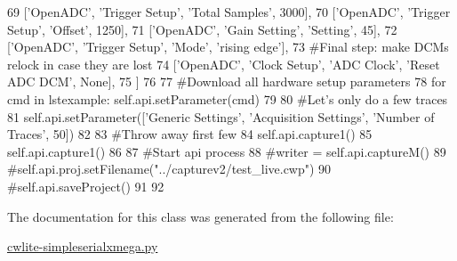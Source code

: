 \begin{DoxyCode}
69                       [\textcolor{stringliteral}{'OpenADC'}, \textcolor{stringliteral}{'Trigger Setup'}, \textcolor{stringliteral}{'Total Samples'}, 3000],
70                       [\textcolor{stringliteral}{'OpenADC'}, \textcolor{stringliteral}{'Trigger Setup'}, \textcolor{stringliteral}{'Offset'}, 1250],
71                       [\textcolor{stringliteral}{'OpenADC'}, \textcolor{stringliteral}{'Gain Setting'}, \textcolor{stringliteral}{'Setting'}, 45],
72                       [\textcolor{stringliteral}{'OpenADC'}, \textcolor{stringliteral}{'Trigger Setup'}, \textcolor{stringliteral}{'Mode'}, \textcolor{stringliteral}{'rising edge'}],
73                       \textcolor{comment}{#Final step: make DCMs relock in case they are lost}
74                       [\textcolor{stringliteral}{'OpenADC'}, \textcolor{stringliteral}{'Clock Setup'}, \textcolor{stringliteral}{'ADC Clock'}, \textcolor{stringliteral}{'Reset ADC DCM'}, \textcolor{keywordtype}{None}],
75                       ]
76         
77         \textcolor{comment}{#Download all hardware setup parameters}
78         \textcolor{keywordflow}{for} cmd \textcolor{keywordflow}{in} lstexample: self.api.setParameter(cmd)
79         
80         \textcolor{comment}{#Let's only do a few traces}
81         self.api.setParameter([\textcolor{stringliteral}{'Generic Settings'}, \textcolor{stringliteral}{'Acquisition Settings'}, \textcolor{stringliteral}{'Number of Traces'}, 50])
82                       
83         \textcolor{comment}{#Throw away first few}
84         self.api.capture1()
85         self.api.capture1()
86 
87         \textcolor{comment}{#Start api process}
88         \textcolor{comment}{#writer = self.api.captureM()}
89         \textcolor{comment}{#self.api.proj.setFilename("../capturev2/test\_live.cwp")}
90         \textcolor{comment}{#self.api.saveProject()}
91 
92 
\end{DoxyCode}


The documentation for this class was generated from the following file\+:\begin{DoxyCompactItemize}
\item 
\hyperlink{cwlite-simpleserialxmega_8py}{cwlite-\/simpleserialxmega.\+py}\end{DoxyCompactItemize}

